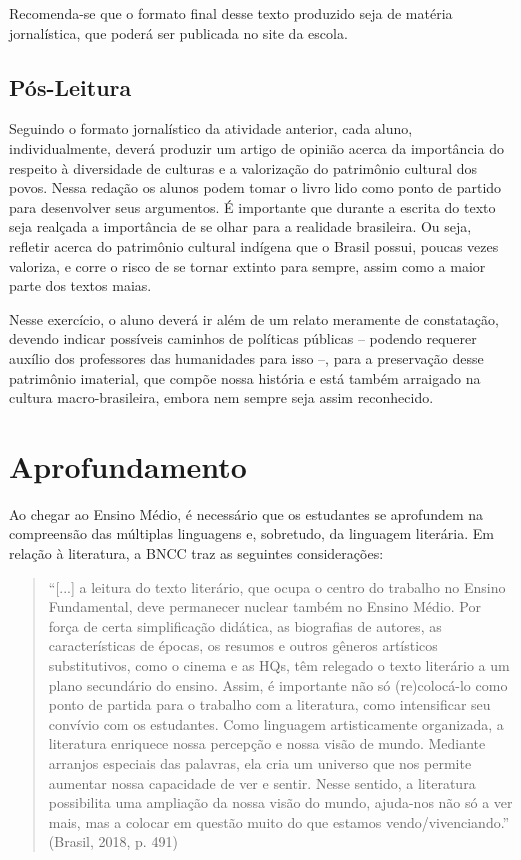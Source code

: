 \documentclass[12pt]{extarticle}
\begin{document}
Recomenda-se que o formato final desse texto produzido seja de matéria
jornalística, que poderá ser publicada no site da escola.

\subsection{Pós-Leitura}

Seguindo o formato jornalístico da atividade anterior, cada
aluno, individualmente, deverá produzir um artigo de opinião acerca da
importância do respeito à diversidade de culturas e a valorização do
patrimônio cultural dos povos. Nessa redação os alunos podem tomar o
livro lido como ponto de partido para desenvolver seus argumentos. É
importante que durante a escrita do texto seja realçada a importância de
se olhar para a realidade brasileira. Ou seja, refletir acerca do
patrimônio cultural indígena que o Brasil possui, poucas vezes valoriza,
e corre o risco de se tornar extinto para sempre, assim como a maior
parte dos textos maias.

Nesse exercício, o aluno deverá ir além de um relato meramente de
constatação, devendo indicar possíveis caminhos de políticas públicas --
podendo requerer auxílio dos professores das humanidades para isso --,
para a preservação desse patrimônio imaterial, que compõe nossa história
e está também arraigado na cultura macro-brasileira, embora nem sempre
seja assim reconhecido.

\section{Aprofundamento}

Ao chegar ao Ensino Médio, é necessário que os estudantes se aprofundem
na compreensão das múltiplas linguagens e, sobretudo, da linguagem
literária. Em relação à literatura, a BNCC traz as seguintes
considerações:

\begin{quote}
``{[}...{]} a leitura do texto literário, que ocupa o centro do trabalho
no Ensino Fundamental, deve permanecer nuclear também no Ensino Médio.
Por força de certa simplificação didática, as biografias de autores, as
características de épocas, os resumos e outros gêneros artísticos
substitutivos, como o cinema e as HQs, têm relegado o texto literário a
um plano secundário do ensino. Assim, é importante não só (re)colocá-lo
como ponto de partida para o trabalho com a literatura, como
intensificar seu convívio com os estudantes. Como linguagem
artisticamente organizada, a literatura enriquece nossa percepção e
nossa visão de mundo. Mediante arranjos especiais das palavras, ela cria
um universo que nos permite aumentar nossa capacidade de ver e sentir.
Nesse sentido, a literatura possibilita uma ampliação da nossa visão do
mundo, ajuda-nos não só a ver mais, mas a colocar em questão muito do
que estamos vendo/vivenciando.'' (Brasil, 2018, p. 491)
\end{quote}
\end{document}
